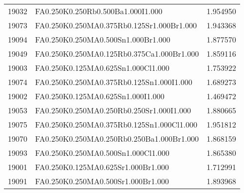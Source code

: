 \begin{table}[htbp]
\begin{tabular}{rlr}
19032 & FA0.250K0.250Rb0.500Ba1.000I1.000 & 1.954950\\[0pt]
19073 & FA0.250K0.250MA0.375Rb0.125Sr1.000Br1.000 & 1.943368\\[0pt]
19094 & FA0.250K0.250MA0.500Sn1.000Br1.000 & 1.877570\\[0pt]
19049 & FA0.250K0.250MA0.125Rb0.375Ca1.000Br1.000 & 1.859116\\[0pt]
19003 & FA0.250K0.125MA0.625Sn1.000Cl1.000 & 1.753922\\[0pt]
19074 & FA0.250K0.250MA0.375Rb0.125Sn1.000I1.000 & 1.689273\\[0pt]
19002 & FA0.250K0.125MA0.625Sn1.000I1.000 & 1.469472\\[0pt]
19053 & FA0.250K0.250MA0.250Rb0.250Sr1.000I1.000 & 1.880665\\[0pt]
19075 & FA0.250K0.250MA0.375Rb0.125Sn1.000Cl1.000 & 1.951812\\[0pt]
19070 & FA0.250K0.250MA0.250Rb0.250Ba1.000Br1.000 & 1.868159\\[0pt]
19093 & FA0.250K0.250MA0.500Sn1.000Cl1.000 & 1.865380\\[0pt]
19001 & FA0.250K0.125MA0.625Sr1.000Br1.000 & 1.712991\\[0pt]
19091 & FA0.250K0.250MA0.500Sr1.000Br1.000 & 1.893968\\[0pt]
\end{tabular}
\end{table}
